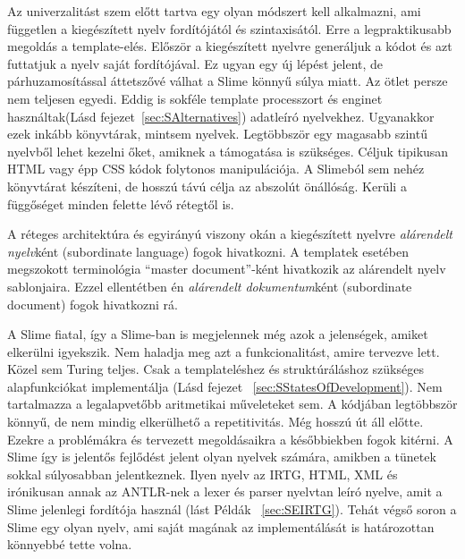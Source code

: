 Az univerzalitást szem előtt tartva egy olyan módszert kell alkalmazni, ami független a kiegészített nyelv fordítójától és szintaxisától. 
Erre a legpraktikusabb megoldás a template-elés. 
Először a kiegészített nyelvre generáljuk a kódot és azt futtatjuk a nyelv saját fordítójával. 
Ez ugyan egy új lépést jelent, de párhuzamosítással áttetszővé válhat a Slime könnyű súlya miatt. 
Az ötlet persze nem teljesen egyedi. 
Eddig is sokféle template processzort és enginet használtak(Lásd fejezet~\ref{sec:SAlternatives}) adatleíró nyelvekhez. 
Ugyanakkor ezek inkább könyvtárak, mintsem nyelvek.
Legtöbbször egy magasabb szintű nyelvből lehet kezelni őket, amiknek a támogatása is szükséges. 
Céljuk tipikusan HTML vagy épp CSS kódok folytonos manipulációja. 
A Slimeból sem nehéz könyvtárat készíteni, de hosszú távú célja az abszolút önállóság. 
Kerüli a függőséget minden felette lévő rétegtől is.

A réteges architektúra és egyirányú viszony okán a kiegészített nyelvre \textit{alárendelt nyelv}ként (subordinate language) fogok hivatkozni.
A templatek esetében megszokott terminológia ``master document''-ként hivatkozik az alárendelt nyelv sablonjaira.
Ezzel ellentétben én \textit{alárendelt dokumentum}ként (subordinate document) fogok hivatkozni rá. 

A Slime fiatal, így a Slime-ban is megjelennek még azok a jelenségek, amiket elkerülni igyekszik. 
Nem haladja meg azt a funkcionalitást, amire tervezve lett. 
Közel sem Turing teljes. 
Csak a templateléshez és struktúráláshoz szükséges alapfunkciókat implementálja (Lásd fejezet ~\ref{sec:SStatesOfDevelopment}). 
Nem tartalmazza a legalapvetőbb aritmetikai műveleteket sem. 
A kódjában legtöbbször könnyű, de nem mindig elkerülhető a repetitivitás. 
Még hosszú út áll előtte. 
Ezekre a problémákra és tervezett megoldásaikra a későbbiekben fogok kitérni. 
A Slime így is jelentős fejlődést jelent olyan nyelvek számára, amikben a tünetek sokkal súlyosabban jelentkeznek. 
Ilyen nyelv az IRTG, HTML, XML és irónikusan annak az ANTLR-nek a lexer és parser nyelvtan leíró nyelve, amit a Slime jelenlegi fordítója használ (lást Példák ~\ref{sec:SEIRTG}). 
Tehát végső soron a Slime egy olyan nyelv, ami saját magának az implementálását is határozottan könnyebbé tette volna.


